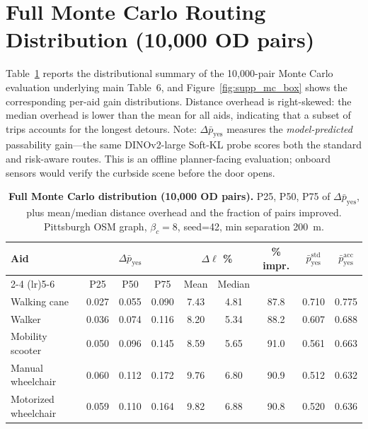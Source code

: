 \documentclass[conference]{IEEEtran}
\begin{document}
\FloatBarrier
\section{Full Monte Carlo Routing Distribution (10{,}000 OD pairs)}
\label{sec:supp_mc}

Table~\ref{tab:supp_mc_full} reports the distributional summary of the 10{,}000-pair Monte Carlo evaluation underlying main Table~6, and Figure~\ref{fig:supp_mc_box} shows the corresponding per-aid gain distributions. Distance overhead is right-skewed: the median overhead is lower than the mean for all aids, indicating that a subset of trips accounts for the longest detours. Note: $\Delta\bar{p}_\mathrm{yes}$ measures the \emph{model-predicted} passability gain---the same DINOv2-large Soft-KL probe scores both the standard and risk-aware routes. This is an offline planner-facing evaluation; onboard sensors would verify the curbside scene before the door opens.

\begin{table}[!t]
\caption{\textbf{Full Monte Carlo distribution (10{,}000 OD pairs).} P25, P50, P75 of $\Delta\bar{p}_\mathrm{yes}$, plus mean/median distance overhead and the fraction of pairs improved. Pittsburgh OSM graph, $\beta_c=8$, seed=42, min separation 200~m.}
\label{tab:supp_mc_full}
\centering\scriptsize
\setlength{\tabcolsep}{3pt}
\begin{tabular}{@{}lcccccccc@{}}
\toprule
\textbf{Aid} & \multicolumn{3}{c}{$\Delta\bar{p}_\mathrm{yes}$} & \multicolumn{2}{c}{$\Delta\ell$ \%} & \textbf{\% impr.} & $\bar{p}_\mathrm{yes}^\mathrm{std}$ & $\bar{p}_\mathrm{yes}^\mathrm{acc}$ \\
\cmidrule(lr){2-4} \cmidrule(lr){5-6}
& P25 & P50 & P75 & Mean & Median & & & \\
\midrule
Walking cane         & 0.027 & 0.055 & 0.090 & 7.43 & 4.81 & 87.8 & 0.710 & 0.775 \\
Walker               & 0.036 & 0.074 & 0.116 & 8.20 & 5.34 & 88.2 & 0.607 & 0.688 \\
Mobility scooter     & 0.050 & 0.096 & 0.145 & 8.59 & 5.65 & 91.0 & 0.561 & 0.663 \\
Manual wheelchair    & 0.060 & 0.112 & 0.172 & 9.76 & 6.80 & 90.9 & 0.512 & 0.632 \\
Motorized wheelchair & 0.059 & 0.110 & 0.164 & 9.82 & 6.88 & 90.8 & 0.520 & 0.636 \\
\bottomrule
\end{tabular}
\end{table}
\end{document}
